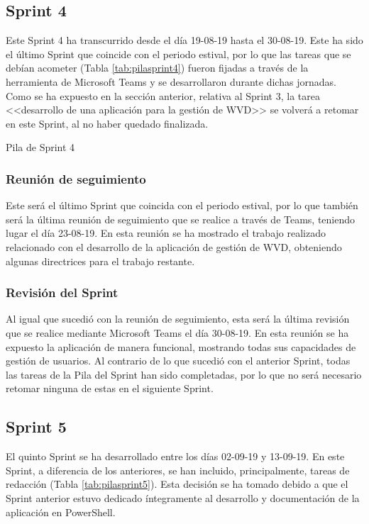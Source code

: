 \clearpage

\subsection{Sprint 4}
Este Sprint 4 ha transcurrido desde el día 19-08-19 hasta el 30-08-19. Este ha sido el último Sprint que coincide con el periodo estival, por lo que las tareas que se debían acometer (Tabla \ref{tab:pilasprint4}) fueron fijadas a través de la herramienta de Microsoft Teams y se desarrollaron durante dichas jornadas. Como se ha expuesto en la sección anterior, relativa al Sprint 3, la tarea <<desarrollo de una aplicación para la gestión de \acs{WVD}>> se volverá a retomar en este Sprint, al no haber quedado finalizada.

\begin{table}[!htbp]
	\centering
	{\small
		
	}
	\caption[Pila de Sprint 4]
	{Pila de Sprint 4}
	\label{tab:pilasprint4}
\end{table}

\subsubsection{Reunión de seguimiento}
Este será el último Sprint que coincida con el periodo estival, por lo que también será la última reunión de seguimiento que se realice a través de Teams, teniendo lugar el día 23-08-19. En esta reunión se ha mostrado el trabajo realizado relacionado con el desarrollo de la aplicación de gestión de \acs{WVD}, obteniendo algunas directrices para el trabajo restante.

\subsubsection{Revisión del Sprint}
Al igual que sucedió con la reunión de seguimiento, esta será la última revisión que se realice mediante Microsoft Teams el día 30-08-19. En esta reunión se ha expuesto la aplicación de manera funcional, mostrando todas sus capacidades de gestión de usuarios. Al contrario de lo que sucedió con el anterior Sprint, todas las tareas de la Pila del Sprint han sido completadas, por lo que no será necesario retomar ninguna de estas en el siguiente Sprint.


\clearpage


\subsection{Sprint 5}
El quinto Sprint se ha desarrollado entre los días 02-09-19 y 13-09-19. En este Sprint, a diferencia de los anteriores, se han incluido, principalmente, tareas de redacción (Tabla \ref{tab:pilasprint5}). Esta decisión se ha tomado debido a que el Sprint anterior estuvo dedicado íntegramente al desarrollo y documentación de la aplicación en PowerShell.

